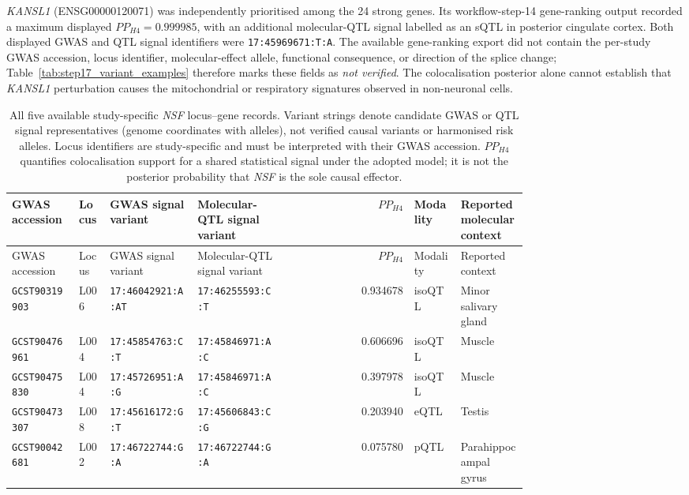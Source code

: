 \documentclass[11pt,a4paper]{article}
\begin{document}
\textit{KANSL1} (ENSG00000120071) was independently prioritised among the 24 strong genes. Its workflow-step-14 gene-ranking output recorded a maximum displayed $PP_{H4}=0.999985$, with an additional molecular-QTL signal labelled as an sQTL in posterior cingulate cortex. Both displayed GWAS and QTL signal identifiers were \texttt{17:45969671:T:A}. The available gene-ranking export did not contain the per-study GWAS accession, locus identifier, molecular-effect allele, functional consequence, or direction of the splice change; Table~\ref{tab:step17_variant_examples} therefore marks these fields as \emph{not verified}. The colocalisation posterior alone cannot establish that \textit{KANSL1} perturbation causes the mitochondrial or respiratory signatures observed in non-neuronal cells.

\begin{landscape}
\begingroup\footnotesize\setlength{\tabcolsep}{3pt}
\begin{longtable}{@{}p{0.13\linewidth}p{0.065\linewidth}p{0.17\linewidth}p{0.17\linewidth}r p{0.09\linewidth}p{0.13\linewidth}@{}}
\caption{All five available study-specific \textit{NSF} locus--gene records. Variant strings denote candidate GWAS or QTL signal representatives (genome coordinates with alleles), not verified causal variants or harmonised risk alleles. Locus identifiers are study-specific and must be interpreted with their GWAS accession. $PP_{H4}$ quantifies colocalisation support for a shared statistical signal under the adopted model; it is not the posterior probability that \textit{NSF} is the sole causal effector.}\label{tab:step17_nsf_loci}\\
\toprule
GWAS accession & Locus & GWAS signal variant & Molecular-QTL signal variant & $PP_{H4}$ & Modality & Reported molecular context \\
\midrule\endfirsthead
\toprule GWAS accession & Locus & GWAS signal variant & Molecular-QTL signal variant & $PP_{H4}$ & Modality & Reported context \\
\midrule\endhead
\bottomrule\endlastfoot
\texttt{GCST90319903} & L006 & \texttt{17:46042921:A:AT} & \texttt{17:46255593:C:T} & 0.934678 & isoQTL & Minor salivary gland\\
\texttt{GCST90476961} & L004 & \texttt{17:45854763:C:T} & \texttt{17:45846971:A:C} & 0.606696 & isoQTL & Muscle\\
\texttt{GCST90475830} & L004 & \texttt{17:45726951:A:G} & \texttt{17:45846971:A:C} & 0.397978 & isoQTL & Muscle\\
\texttt{GCST90473307} & L008 & \texttt{17:45616172:G:T} & \texttt{17:45606843:C:G} & 0.203940 & eQTL & Testis\\
\texttt{GCST90042681} & L002 & \texttt{17:46722744:G:A} & \texttt{17:46722744:G:A} & 0.075780 & pQTL & Parahippocampal gyrus\\
\end{longtable}\endgroup
\end{landscape}
\end{document}
